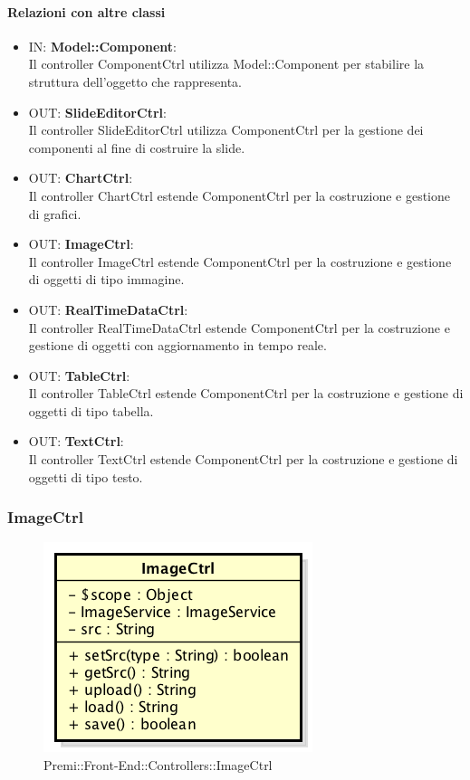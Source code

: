 	\paragraph{Relazioni con altre classi}
	\begin{itemize}

	 \item IN: \textbf{Model::Component}:\\
		Il controller ComponentCtrl utilizza Model::Component per stabilire la struttura dell'oggetto che rappresenta.
	 \item OUT: \textbf{SlideEditorCtrl}:\\
		Il controller SlideEditorCtrl utilizza ComponentCtrl per la gestione dei componenti al fine di costruire la slide.
	 \item OUT: \textbf{ChartCtrl}:\\
	 	Il controller ChartCtrl estende ComponentCtrl per la costruzione e gestione di grafici.
	 \item OUT: \textbf{ImageCtrl}:\\
		Il controller ImageCtrl estende ComponentCtrl per la costruzione e gestione di oggetti di tipo immagine.
	 \item OUT: \textbf{RealTimeDataCtrl}:\\
		Il controller RealTimeDataCtrl estende ComponentCtrl per la costruzione e gestione di oggetti con aggiornamento in tempo reale.
	 \item OUT: \textbf{TableCtrl}:\\
		Il controller TableCtrl estende ComponentCtrl per la costruzione e gestione di oggetti di tipo tabella.
	 \item OUT: \textbf{TextCtrl}:\\
		Il controller TextCtrl estende ComponentCtrl per la costruzione e gestione di oggetti di tipo testo.

	\end{itemize}

\newpage

\subsubsection{ImageCtrl}
\begin{figure}[h]
	\centering
	\includegraphics[width=0.4\linewidth]{img/premi_front_end_controllers_imagectrl}
	\caption[Premi::Front-End::Controllers::ImageCtrl]{Premi::Front-End::Controllers::ImageCtrl}
\end{figure}
